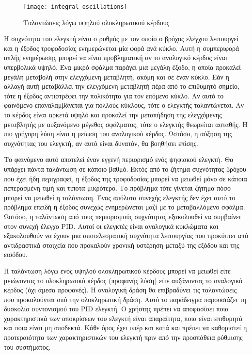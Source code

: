\begin{figure}[h]
  \centering
  \texttt{[image: integral\_oscillations]}
  \caption{Ταλαντώσεις λόγω υψηλού ολοκληρωτικού κέρδους}
  \label{fig:integral_oscillations}
\end{figure}

Η συχνότητα του ελεγκτή είναι ο ρυθμός με τον οποίο ο βρόχος ελέγχου λειτουργεί και η έξοδος τροφοδοσίας ενημερώνεται μία φορά ανά κύκλο. Αυτή η συμπεριφορά απλής ενημέρωσης μπορεί να είναι προβληματική αν το αναλογικό κέρδος είναι υπερβολικά υψηλό. Ένα μικρό σφάλμα παράγει μια μεγάλη έξοδο, η οποία προκαλεί μεγάλη μεταβολή στην ελεγχόμενη μεταβλητή, ακόμη και σε έναν κύκλο. Εάν η αλλαγή αυτή μεταβάλλει την ελεγχόμενη μεταβλητή πέρα από το επιθυμητό σημείο, τότε η έξοδος αντιστρέφει την πολικότητα για τον επόμενο κύκλο. Αν αυτό το φαινόμενο επαναλαμβάνεται για πολλούς κύκλους, τότε ο ελεγκτής ταλαντώνεται. Αν το κέρδος είναι αρκετά υψηλό και προκαλεί την μεταπήδηση της ελεγχόμενης μεταβλητής με αυξανόμενο μέγεθος σφάλματος, τότε ο ελεγκτής θεωρείται ασταθής. Η πιο γρήγορη λύση είναι η μείωση του αναλογικού κέρδος. Ωστόσο, η αύξηση της συχνότητας του ελεγκτή, αν αυτό είναι δυνατόν, θα βοηθήσει επίσης.

Το φαινόμενο αυτό αποτελεί έναν εγγενή περιορισμό ενός ψηφιακού ελεγκτή. Θα υπάρχει πάντα ταλάντωση σε κάποιο βαθμό. Εκτός από το ζήτημα συχνότητας βρόχου που έχει ήδη περιγραφεί, η έξοδος της τροφοδοσίας μπορεί να μειωθεί μόνο σε κάποια πεπερασμένη τιμή και τίποτα μικρότερο. Το πρόβλημα τότε γίνεται ζήτημα πόσο μπορεί να μειωθεί η ταλάντωση. Ένας απόλυτα συνεχής ελεγκτής δεν έχει αυτό το πρόβλημα επειδή η έξοδος συνεχώς ενημερώνεται μαζί με το μεταβαλλόμενο σφάλμα. Ωστόσο, η ταλάντωση από τους περιορισμούς συχνότητας εξακολουθεί να συμβαίνει στον συνεχή έλεγχο PID. Αυτοί οι ελεγκτές είναι αναλογικά κυκλώματα και εξακολουθούν να έχουν μια αποτελεσματική συχνότητα λειτουργίας που προκύπτει από αντιδραστικά στοιχεία που προκαλούν χρονική υστέρηση μεταξύ της εξόδου και της εισόδου.

Η ταλάντωση λόγω ενός υψηλού ολοκληρωτικού κέρδους μπορεί να μειωθεί είτε μειώνοντας το ολοκληρωτικό κέρδος (προφανής λύση) είτε αυξάνοντας το αναλογικό κέρδος (όχι άμεσα προφανές). Η αναλογική δράση θα επιβραδύνει τις ταλαντώσεις που προκαλούνται από την ολοκληρωτική δράση. Αυτό το παράδειγμα παρουσιάζει τη δυσκολία συντονισμού του PID ελεγκτή. Ο χρήστης πρέπει να αποφασίσει ποια χαρακτηριστικά των αποκρίσεων του ελεγκτή είναι απαραίτητα, ποια είναι επιθυμητά και ποια είναι μη αποδεκτά. Κάθε όρος έχει υπέρ και κατά και πρέπει να καθοριστεί η προτεραιότητα των χαρακτηριστικών του ελεγκτή πριν από την προσπάθεια ρύθμισης του συστήματος.

